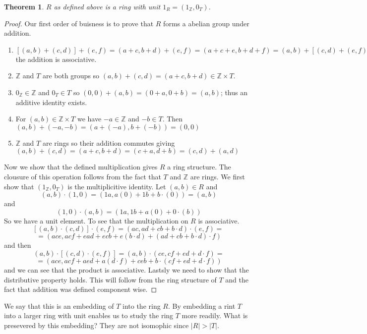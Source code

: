 \documentclass[11pt,largemargins]{homework}
\newcommand{\Z}{\mathbb{Z}}
\newtheorem{theorem}{Theorem}
\begin{document}
\begin{theorem}
    $R$ as defined above is a ring with unit $1_R = (1_\Z, 0_T)$. 
\end{theorem}

\begin{proof}
    Our first order of buisness is to prove that $R$ forms a abelian group under addition. 
    \begin{enumerate}
        \item $[(a, b) + (c, d)] +(e, f) = (a+c, b+d) + (e, f) = (a + c + e, b + d + f) = (a, b) + [(c, d) + (e, f)]$
        the addition is associative. 
        \item $\Z$ and $T$ are both groups so $(a, b) + (c, d) = (a + c, b+ d) \in \Z \times T$.  
        \item $0_\Z \in \Z$ and $0_T \in T$ so $(0, 0) + (a, b ) = (0 + a, 0 + b) = (a, b)$; thus an additive identity exists. 
        \item For $(a, b) \in \Z \times T$ we have $-a \in \Z$ and $-b \in T$. Then $(a, b) + (-a, -b) = (a + (-a), b + (-b)) = (0, 0)$
        \item $\Z$ and $T$ are rings so their addition commutes giving $(a, b) + (c, d) = (a + c, b + d) = (c + a, d + b) = (c, d) + ( a, d)$
    \end{enumerate}
    Now we show that the defined multiplication gives $R$ a ring structure. The clousure of this operation follows from the fact that 
    $T$ and $\Z$ are rings. We first show that $(1_\Z, 0_T)$ is the multiplicitive identity. Let $(a, b) \in R$ and 
    \[ (a, b) \cdot (1, 0) = (1a, a(0) + 1b + b \cdot (0)) = (a, b) \]
    and 
    \[(1, 0) \cdot (a, b) = (1a, 1b + a(0) + 0 \cdot (b))\] 
    So we have a unit element. To see that the multiplication on $R$ is associative. 
    \[[(a, b) \cdot (c, d)] \cdot (e, f) = (ac, ad + c b + b \cdot d) \cdot (e, f) =\, \] 
    \[ = (ace, acf + ead + ec b + e(b \cdot d) +  (ad + c b + b \cdot d) \cdot f )\]
    and then 
    \[(a, b) \cdot [(c, d) \cdot (e, f)] = (a, b) \cdot (ce,cf + ed + d \cdot f) = \] 
    \[ =(ace, acf + aed + a(d \cdot f) + ce b + b \cdot (cf + ed + d \cdot f))\]
    and we can see that the product is associative. Lastsly we need to show that the distributive property holds. 
    This will follow from the ring structure of $T$ and the fact that addition was defined component wise. 
\end{proof}
We say that this is an embedding of $T$ into the ring $R$. 
By embedding a rint $T$ into a larger ring with unit enables us to study the ring $T$ more readily. What is presevered by 
this embedding? They are not isomophic since $|R| > |T|$. 
\end{document}
